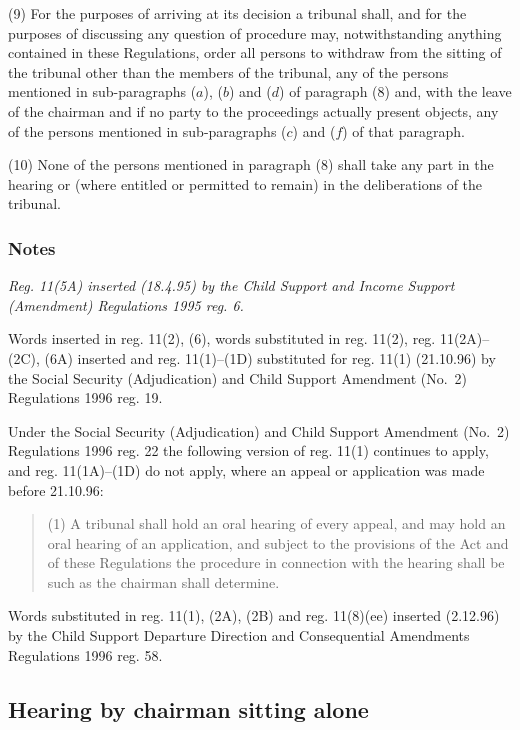 \documentclass[a4paper]{article}
\newcommand\amendment[1]{\subsubsection*{Notes}{\itshape\frenchspacing\footnotesize #1 \par}}
\begin{document}
(9) For the purposes of arriving at its decision a tribunal shall, and for the purposes of discussing any question of procedure may, notwithstanding anything contained in these Regulations, order all persons to withdraw from the sitting of the tribunal other than the members of the tribunal, any of the persons mentioned in sub-paragraphs ($a$), ($b$) and ($d$) of paragraph (8) and, with the leave of the chairman and if no party to the proceedings actually present objects, any of the persons mentioned in sub-paragraphs ($c$) and ($f$) of that paragraph.

(10) None of the persons mentioned in paragraph (8) shall take any part in the hearing or (where entitled or permitted to remain) in the deliberations of the tribunal.

\amendment{
Reg. 11(5A) inserted (18.4.95) by the Child Support and Income Support (Amendment) Regulations 1995 reg. 6.

Words inserted in reg. 11(2), (6), words substituted in reg. 11(2), reg. 11(2A)--(2C), (6A) inserted and reg. 11(1)--(1D) substituted for reg. 11(1) (21.10.96) by the Social Security (Adjudication) and Child Support Amendment (No.\ 2) Regulations 1996 reg. 19.

Under the Social Security (Adjudication) and Child Support Amendment (No.\ 2) Regulations 1996 reg. 22 the following version of reg. 11(1) continues to apply, and reg. 11(1A)--(1D) do not apply, where an appeal or application was made before 21.10.96:
\begin{quotation}
(1) A tribunal shall hold an oral hearing of every appeal, and may hold an oral hearing of an application, and subject to the provisions of the Act and of these Regulations the procedure in connection with the hearing shall be such as the chairman shall determine.
\end{quotation}

Words substituted in reg. 11(1), (2A), (2B) and reg. 11(8)(ee) inserted (2.12.96) by the Child Support Departure Direction and Consequential Amendments Regulations 1996 reg. 58.
}


\subsection[11A. Hearing by chairman sitting alone]{Hearing by chairman sitting alone}
\end{document}
